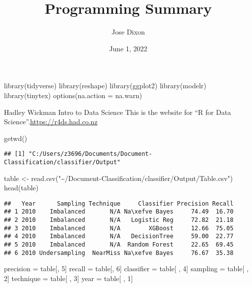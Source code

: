 \documentclass[
]{article}
\title{Programming Summary}
\author{Jose Dixon}
\date{June 1, 2022}
\newenvironment{Shaded}{\begin{snugshade}}{\end{snugshade}}
\newcommand{\AttributeTok}[1]{\textcolor[rgb]{0.77,0.63,0.00}{#1}}
\newcommand{\DecValTok}[1]{\textcolor[rgb]{0.00,0.00,0.81}{#1}}
\newcommand{\FunctionTok}[1]{\textcolor[rgb]{0.00,0.00,0.00}{#1}}
\newcommand{\NormalTok}[1]{#1}
\newcommand{\OtherTok}[1]{\textcolor[rgb]{0.56,0.35,0.01}{#1}}
\newcommand{\StringTok}[1]{\textcolor[rgb]{0.31,0.60,0.02}{#1}}
\begin{document}
\maketitle

\begin{Shaded}
\begin{Highlighting}[]
\FunctionTok{library}\NormalTok{(tidyverse)}
\FunctionTok{library}\NormalTok{(reshape)}
\FunctionTok{library}\NormalTok{(ggplot2)}
\FunctionTok{library}\NormalTok{(modelr)}
\FunctionTok{library}\NormalTok{(tinytex)}
\FunctionTok{options}\NormalTok{(}\AttributeTok{na.action =}\NormalTok{ na.warn)}
\end{Highlighting}
\end{Shaded}

Hadley Wickman Intro to Data Science This is the website for ``R for
Data Science''.\url{https://r4ds.had.co.nz}

\begin{Shaded}
\begin{Highlighting}[]
\FunctionTok{getwd}\NormalTok{()}
\end{Highlighting}
\end{Shaded}

\begin{verbatim}
## [1] "C:/Users/z3696/Documents/Document-Classification/classifier/Output"
\end{verbatim}

\begin{Shaded}
\begin{Highlighting}[]
\NormalTok{table }\OtherTok{\textless{}{-}} \FunctionTok{read.csv}\NormalTok{(}\StringTok{"\textasciitilde{}/Document{-}Classification/classifier/Output/Table.csv"}\NormalTok{)}
\FunctionTok{head}\NormalTok{(table)}
\end{Highlighting}
\end{Shaded}

\begin{verbatim}
##   Year      Sampling Technique     Classifier Precision Recall
## 1 2010    Imbalanced       N/A Na\xefve Bayes     74.49  16.70
## 2 2010    Imbalanced       N/A   Logistic Reg     72.82  21.18
## 3 2010    Imbalanced       N/A        XGBoost     12.66  75.05
## 4 2010    Imbalanced       N/A   DecisionTree     59.00  22.77
## 5 2010    Imbalanced       N/A  Random Forest     22.65  69.45
## 6 2010 Undersampling  NearMiss Na\xefve Bayes     76.67  35.38
\end{verbatim}

\begin{Shaded}
\begin{Highlighting}[]
\NormalTok{precision }\OtherTok{=}\NormalTok{ table[, }\DecValTok{5}\NormalTok{]}
\NormalTok{recall }\OtherTok{=}\NormalTok{ table[, }\DecValTok{6}\NormalTok{]}
\NormalTok{classifier }\OtherTok{=}\NormalTok{ table[ , }\DecValTok{4}\NormalTok{]}
\NormalTok{sampling }\OtherTok{=}\NormalTok{ table[ , }\DecValTok{2}\NormalTok{]}
\NormalTok{technique }\OtherTok{=}\NormalTok{ table[ , }\DecValTok{3}\NormalTok{]}
\NormalTok{year }\OtherTok{=}\NormalTok{ table[ , }\DecValTok{1}\NormalTok{]}
\end{Highlighting}
\end{Shaded}
\end{document}
